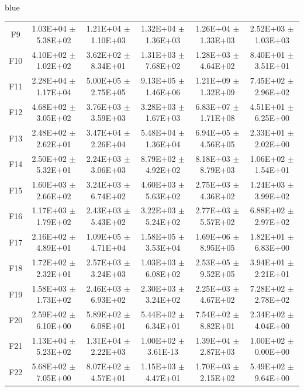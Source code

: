 \documentclass[journal, onecolumn]{IEEEtran}
\begin{document}
\begin{color}{blue}
\begin{table}[htbp!]
\begin{tabular}{c|ccccc}
		F9	 &	1.03E+04	$\pm$	5.38E+02		 &	1.21E+04	$\pm$	1.10E+03		 &	1.32E+04	$\pm$	1.36E+03		 &	1.26E+04	$\pm$	1.33E+03		 &	2.52E+03	$\pm$	1.03E+03	\\
		F10	 &	4.10E+02	$\pm$	1.02E+02		 &	3.62E+02	$\pm$	8.34E+01		 &	1.31E+03	$\pm$	7.68E+02		 &	1.28E+03	$\pm$	4.64E+02		 &	8.40E+01	$\pm$	3.51E+01	\\
		F11	 &	2.28E+04	$\pm$	1.17E+04		 &	5.00E+05	$\pm$	2.75E+05		 &	9.13E+05	$\pm$	1.46E+06		 &	1.21E+09	$\pm$	1.32E+09		 &	7.45E+02	$\pm$	2.96E+02	\\
		F12	 &	4.68E+02	$\pm$	3.05E+02		 &	3.76E+03	$\pm$	3.59E+03		 &	3.28E+03	$\pm$	1.67E+03		 &	6.83E+07	$\pm$	1.71E+08		 &	4.51E+01	$\pm$	6.25E+00	\\
		F13	 &	2.48E+02	$\pm$	2.62E+01		 &	3.47E+04	$\pm$	2.26E+04		 &	5.48E+04	$\pm$	1.36E+04		 &	6.94E+05	$\pm$	4.56E+05		 &	2.33E+01	$\pm$	2.02E+00	\\
		F14	 &	2.50E+02	$\pm$	5.32E+01		 &	2.24E+03	$\pm$	3.06E+03		 &	8.79E+02	$\pm$	4.92E+02		 &	8.18E+03	$\pm$	8.79E+03		 &	1.06E+02	$\pm$	1.54E+01	\\
		F15	 &	1.60E+03	$\pm$	2.66E+02		 &	3.24E+03	$\pm$	6.74E+02		 &	4.60E+03	$\pm$	5.63E+02		 &	2.75E+03	$\pm$	4.36E+02		 &	1.24E+03	$\pm$	3.99E+02	\\
		F16	 &	1.17E+03	$\pm$	1.79E+02		 &	2.43E+03	$\pm$	5.43E+02		 &	3.22E+03	$\pm$	5.24E+02		 &	2.77E+03	$\pm$	5.57E+02		 &	6.88E+02	$\pm$	2.97E+02	\\
		F17	 &	2.16E+02	$\pm$	4.89E+01		 &	1.09E+05	$\pm$	4.71E+04		 &	1.58E+05	$\pm$	3.53E+04		 &	1.69E+06	$\pm$	8.95E+05		 &	1.82E+01	$\pm$	6.83E+00	\\
		F18	 &	1.72E+02	$\pm$	2.32E+01		 &	2.57E+03	$\pm$	3.24E+03		 &	1.03E+03	$\pm$	6.08E+02		 &	2.53E+05	$\pm$	9.52E+05		 &	3.94E+01	$\pm$	2.21E+01	\\
		F19	 &	1.58E+03	$\pm$	1.73E+02		 &	2.46E+03	$\pm$	6.93E+02		 &	2.30E+03	$\pm$	3.24E+02		 &	2.25E+03	$\pm$	4.67E+02		 &	7.28E+02	$\pm$	2.78E+02	\\
		F20	 &	2.59E+02	$\pm$	6.10E+00		 &	5.89E+02	$\pm$	6.08E+01		 &	5.44E+02	$\pm$	6.34E+01		 &	7.54E+02	$\pm$	8.82E+01		 &	2.34E+02	$\pm$	4.04E+00	\\
		F21	 &	1.13E+04	$\pm$	5.23E+02		 &	1.31E+04	$\pm$	2.22E+03		 &	1.00E+02	$\pm$	3.61E-13		 &	1.39E+04	$\pm$	2.87E+03		 &	1.00E+02	$\pm$	0.00E+00	\\
		F22	 &	5.68E+02	$\pm$	7.05E+00		 &	8.07E+02	$\pm$	4.57E+01		 &	1.15E+03	$\pm$	4.47E+01		 &	1.70E+03	$\pm$	2.15E+02		 &	5.49E+02	$\pm$	9.64E+00	\\

\end{tabular}
\end{table}
\end{color}
\end{document}

